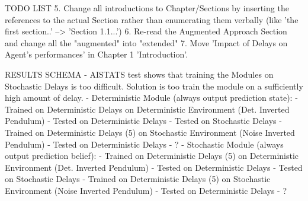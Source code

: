 TODO LIST
5. Change all introductions to Chapter/Sections by inserting the references to the actual Section rather than enumerating them verbally (like 'the first section..' --> 'Section 1.1...')
6. Re-read the Augmented Approach Section and change all the "augmented" into "extended"
7. Move 'Impact of Delays on Agent's performances' in Chapter 1 'Introduction'.




RESULTS SCHEMA
- AISTATS test shows that training the Modules on Stochastic Delays is too difficult. Solution is too train the module on a sufficiently high amount of delay.
- Deterministic Module (always output prediction state):
    - Trained on Deterministic Delays on Deterministic Environment (Det. Inverted Pendulum)
        - Tested on Deterministic Delays
        - Tested on Stochastic Delays
    - Trained on Deterministic Delays (5) on Stochastic Environment (Noise Inverted Pendulum)
        - Tested on Deterministic Delays
        - ?
- Stochastic Module (always output prediction belief):
    - Trained on Deterministic Delays (5) on Deterministic Environment (Det. Inverted Pendulum)
        - Tested on Deterministic Delays
        - Tested on Stochastic Delays
    - Trained on Deterministic Delays (5) on Stochastic Environment (Noise Inverted Pendulum)
        - Tested on Deterministic Delays
        - ?

